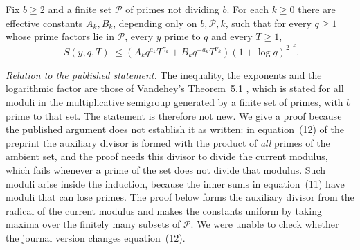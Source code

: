 \documentclass[11pt]{article}
\begin{document}
\begin{lemma}\label{vandestep}
Fix \(b\ge2\) and a finite set \(\mathcal P\) of primes not dividing \(b\).
For each \(k\ge0\) there are effective constants \(A_k,B_k\), depending
only on \(b,\mathcal P,k\), such that for every \(q\ge1\) whose prime
factors lie in \(\mathcal P\), every \(y\) prime to \(q\) and every
\(T\ge1\),
\[
 |S(y,q,T)|\le (A_k q^{a_k}T^{\gamma_k}+B_k q^{-a_k}T^{\nu_k})
                 (1+\log q)^{2^{-k}} .
\]
\end{lemma}
\emph{Relation to the published statement.} The inequality, the
exponents and the logarithmic factor are those of Vandehey's Theorem~5.1
\cite[preprint, pp.~13--14]{vandehey}, which is stated for all moduli in
the multiplicative semigroup generated by a finite set of primes, with
\(b\) prime to that set. The statement is therefore not new. We give a
proof because the published argument does not establish it as written: in
equation~(12) of the preprint the auxiliary divisor is formed with the
product of \emph{all} primes of the ambient set, and the proof needs this
divisor to divide the current modulus, which fails whenever a prime of the
set does not divide that modulus. Such moduli arise inside the induction,
because the inner sums in equation~(11) have moduli that can lose primes.
The proof below forms the auxiliary divisor from the radical of the
current modulus and makes the constants uniform by taking maxima over the
finitely many subsets of \(\mathcal P\). We were unable to check whether
the journal version \cite{vandehey} changes equation~(12).
\end{document}
